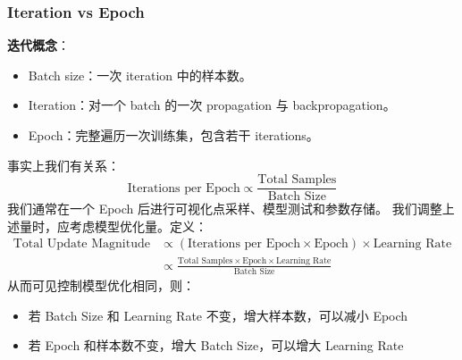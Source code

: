 \subsubsection{Iteration vs Epoch}\label{iteration-vs-epoch}

\textbf{迭代概念}：

\begin{itemize}
\tightlist
\item
  Batch size：一次 iteration 中的样本数。
\item
  Iteration：对一个 batch 的一次 propagation 与 backpropagation。
\item
  Epoch：完整遍历一次训练集，包含若干 iterations。
\end{itemize}

事实上我们有关系： \[
\text{Iterations per Epoch} \propto \frac{\text{Total Samples}}{\text{Batch Size}}
\] 我们通常在一个 Epoch 后进行可视化点采样、模型测试和参数存储。
我们调整上述量时，应考虑模型优化量。定义： \[
\begin{aligned}
\text{Total Update Magnitude}
&\propto (\text{Iterations per Epoch} \times \text{Epoch}) \times \text{Learning Rate} \\
&\propto \frac{\text{Total Samples} \times \text{Epoch} \times \text{Learning Rate}}{\text{Batch Size}}
\end{aligned}
\] 从而可见控制模型优化相同，则：

\begin{itemize}
\tightlist
\item
  若 Batch Size 和 Learning Rate 不变，增大样本数，可以减小 Epoch
\item
  若 Epoch 和样本数不变，增大 Batch Size，可以增大 Learning Rate
\end{itemize}
